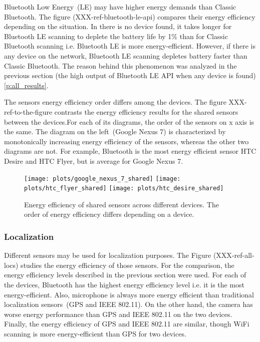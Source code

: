 Bluetooth Low Energy\ (LE) may have higher energy demands than Classic Bluetooth. The figure (XXX-ref-bluetooth-le-api) compares their energy efficiency depending on the situation. In there is no device found, it takes longer for Bluetooth LE scanning to deplete the battery life by 1\% than for Classic Bluetooth scanning i.e. Bluetooth LE is more energy-efficient. However, if there is any device on the network, Bluetooth LE scanning depletes battery faster than Classic Bluetooth. The reason behind this phenomenon was analyzed in the previous section (the high output of Bluetooth LE API when any device is found) \ref{p:all_results}.
	
				
The sensors energy efficiency order differs among the devices. The figure XXX-ref-to-the-figure contrasts the energy efficiency results for the shared sensors between the devices.For each of its diagrams, the order of the sensors on x axis is the same. The diagram on the left\ (Google Nexus 7) is characterized by monotonically increasing energy efficiency of the sensors, whereas the other two diagrams are not. For example, Bluetooth is the most energy efficient sensor HTC Desire and HTC Flyer, but is average for Google Nexus 7.
	
\begin{figure}[H]
\centering
\texttt{[image: plots/google\_nexus\_7\_shared]}
\texttt{[image: plots/htc\_flyer\_shared]}
\texttt{[image: plots/htc\_desire\_shared]}
\caption{\label{p:shared_sensors_results} Energy efficiency of shared sensors across different devices. The order of energy efficiency differs depending on a device. }
\end{figure}		
		
\subsubsection{Localization}

Different sensors may be used for localization purposes. The Figure (XXX-ref-all-locs) studies the energy efficiency of those sensors. For the comparison, the energy efficiency levels described in the previous section were used. For each of the devices, Bluetooth has the highest energy efficiency level i.e. it is the most energy-efficient. Also, microphone is always more energy efficient than traditional localization sensors\ (GPS and IEEE 802.11). On the other hand, the camera has worse energy performance than GPS and IEEE 802.11 on the two devices. Finally, the energy efficiency of GPS and IEEE 802.11 are similar, though WiFi scanning is more energy-efficient than GPS for two devices.  	

